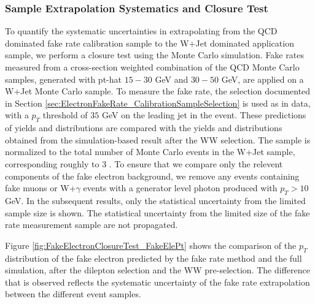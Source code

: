  \subsubsection{Sample Extrapolation Systematics and Closure Test}
\label{sec:FakeElectronBkgClosureTest}
 To quantify the systematic uncertainties in extrapolating from the QCD dominated fake rate
calibration sample to the W+Jet dominated application sample, we perform a closure test using 
the Monte Carlo simulation. Fake rates measured from a cross-section weighted combination of 
the QCD Monte Carlo samples, generated with pt-hat $15-30$ GeV and $30-50$ GeV, are applied on
a W+Jet Monte Carlo sample. To measure the fake rate, the selection documented in Section
\ref{sec:ElectronFakeRate_CalibrationSampleSelection} is used as in data, with a $p_{T}$ 
threshold of $35$ GeV on the leading jet in the event. These predictions of yields and 
distributions are compared with the yields and distributions obtained from the 
simulation-based result after the WW selection. The sample is normalized to the 
total number of Monte Carlo events in the W+Jet sample, corresponding roughly to $3$ \ifb.
To ensure that we compare only the relevent components of the fake electron background,
we remove any events containing fake muons or W+$\gamma$ events with a generator level photon 
produced with $p_{T} > 10$ GeV. In the subsequent results, only the statistical uncertainty 
from the limited sample size is shown. The statistical uncertainty from the limited size of 
the fake rate measurement sample are not propagated. 

Figure \ref{fig:FakeElectronClosureTest_FakeElePt} shows the comparison of the $p_{T}$
distribution of the fake electron predicted by the fake rate method and the full simulation,
after the dilepton selection and the WW pre-selection. The difference that is observed 
reflects the systematic uncertainty of the fake rate extrapolation between the different
event samples. 

